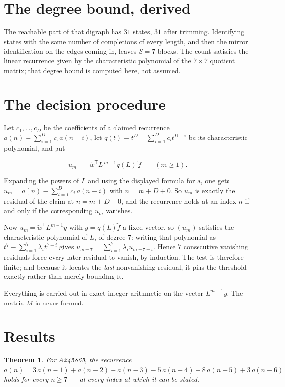 \documentclass[11pt]{article}
\newtheorem{theorem}{Theorem}
\theoremstyle{definition}
\begin{document}
\section{The degree bound, derived}

The reachable part of that digraph has $31$ states, $31$ after trimming. Identifying states with the same number of completions of every length, and then the mirror identification on the edges coming in, leaves $S = 7$ blocks. The count satisfies the linear recurrence given by the characteristic polynomial of the $7\times7$ quotient matrix; that degree bound is computed here, not assumed.

\section{The decision procedure}

Let $c_1,\dots,c_D$ be the coefficients of a claimed recurrence $a(n) = \sum_{i=1}^{D} c_i\,a(n-i)$, let $q(t) = t^{D} - \sum_{i=1}^{D} c_i t^{D-i}$ be its characteristic polynomial, and put

\[u_m \;=\; \tilde w^{\mathsf T} L^{\,m-1} q(L)\,\tilde f \qquad (m \ge 1).\]

Expanding the powers of $L$ and using the displayed formula for $a$, one gets $u_m = a(n) - \sum_{i=1}^{D} c_i\,a(n-i)$ with $n = m + D + 0$. So $u_m$ is exactly the residual of the claim at $n = m + D + 0$, and the recurrence holds at an index $n$ if and only if the corresponding $u_m$ vanishes.

Now $u_m = \tilde w^{\mathsf T} L^{m-1} y$ with $y = q(L)\tilde f$ a fixed vector, so $(u_m)$ satisfies the characteristic polynomial of $L$, of degree $7$: writing that polynomial as $t^{7} - \sum_{i=1}^{7} \lambda_i t^{7-i}$ gives $u_{m+7} = \sum_{i=1}^{7} \lambda_i u_{m+7-i}$. Hence $7$ consecutive vanishing residuals force every later residual to vanish, by induction. The test is therefore finite; and because it locates the {\itshape last} nonvanishing residual, it pins the threshold exactly rather than merely bounding it.

Everything is carried out in exact integer arithmetic on the vector $L^{m-1}y$. The matrix $M$ is never formed.

\section{Results}

\begin{theorem} For A245865, the recurrence $a(n) = 3\,a(n-1) + a(n-2) - a(n-3) - 5\,a(n-4) - 8\,a(n-5) + 3\,a(n-6)$ holds for every $n \ge 7$ --- at every index at which it can be stated.\end{theorem}
\end{document}
